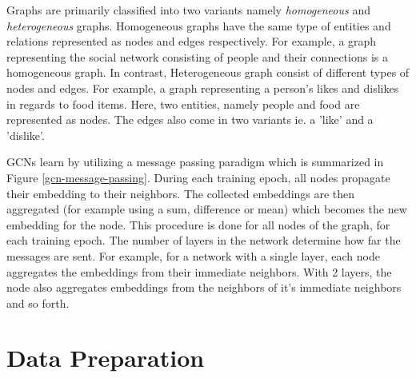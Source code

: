 Graphs are primarily classified into two variants namely
\emph{homogeneous} and \emph{heterogeneous} graphs. Homogeneous graphs
have the same type of entities and relations represented as nodes and
edges respectively. For example, a graph representing the social
network consisting of people and their connections is a homogeneous
graph. In contrast, Heterogeneous graph consist of different types of
nodes and edges. For example, a graph representing a person's likes
and dislikes in regards to food items. Here, two entities, namely
people and food are represented as nodes. The edges also come in two
variants ie. a 'like' and a 'dislike'.

GCNs learn by utilizing a message passing paradigm which is summarized
in Figure \ref{gcn-message-passing}. During each training epoch, all
nodes propagate their embedding to their neighbors. The collected
embeddings are then aggregated (for example using a sum, difference or
mean) which becomes the new embedding for the node. This procedure is
done for all nodes of the graph, for each training epoch. The number
of layers in the network determine how far the messages are sent. For
example, for a network with a single layer, each node aggregates the
embeddings from their immediate neighbors. With 2 layers, the node
also aggregates embeddings from the neighbors of it's immediate
neighbors and so forth.





\section{Data Preparation}
\label{sec:gcn-data-prep}

